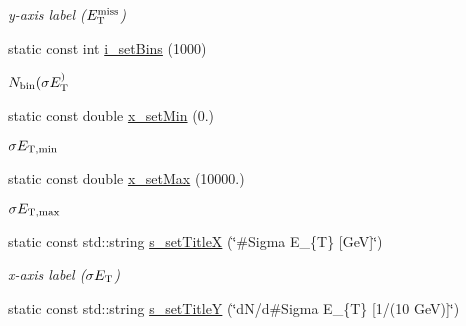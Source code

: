 \begin{CompactItemize}
\begin{CompactList}\small\item\em y-axis label ($E_{\rm T}^{\rm miss}$) \item\end{CompactList}\item 
\hypertarget{namespaceHistGroupCfg_7fcd5443b167cb799029baa462f43d1c}{
static const int \hyperlink{namespaceHistGroupCfg_7fcd5443b167cb799029baa462f43d1c}{i\_\-set\-Bins} (1000)}
\label{namespaceHistGroupCfg_7fcd5443b167cb799029baa462f43d1c}

\begin{CompactList}\small\item\em $N_{\rm bin}(\sigma E_{\rm T}^)$ \item\end{CompactList}\item 
\hypertarget{namespaceHistGroupCfg_10fc14353baebac7e3273a7c90a9befd}{
static const double \hyperlink{namespaceHistGroupCfg_10fc14353baebac7e3273a7c90a9befd}{x\_\-set\-Min} (0.)}
\label{namespaceHistGroupCfg_10fc14353baebac7e3273a7c90a9befd}

\begin{CompactList}\small\item\em $\sigma E_{\rm T,min}$ \item\end{CompactList}\item 
\hypertarget{namespaceHistGroupCfg_20c108737ca28378aa5e9b6b4afec301}{
static const double \hyperlink{namespaceHistGroupCfg_20c108737ca28378aa5e9b6b4afec301}{x\_\-set\-Max} (10000.)}
\label{namespaceHistGroupCfg_20c108737ca28378aa5e9b6b4afec301}

\begin{CompactList}\small\item\em $\sigma E_{\rm T,max}$ \item\end{CompactList}\item 
\hypertarget{namespaceHistGroupCfg_2f7f845e92099b323f0d1415a9eabfd8}{
static const std::string \hyperlink{namespaceHistGroupCfg_2f7f845e92099b323f0d1415a9eabfd8}{s\_\-set\-Title\-X} (\char`\"{}\#Sigma E\_\-\{T\} \mbox{[}Ge\-V\mbox{]}\char`\"{})}
\label{namespaceHistGroupCfg_2f7f845e92099b323f0d1415a9eabfd8}

\begin{CompactList}\small\item\em x-axis label ($\sigma E_{\rm T}$) \item\end{CompactList}\item 
\hypertarget{namespaceHistGroupCfg_cd890445a5f16977a785630b3cfadb93}{
static const std::string \hyperlink{namespaceHistGroupCfg_cd890445a5f16977a785630b3cfadb93}{s\_\-set\-Title\-Y} (\char`\"{}d\-N/d\#Sigma E\_\-\{T\} \mbox{[}1/(10 Ge\-V)\mbox{]}\char`\"{})}
\label{namespaceHistGroupCfg_cd890445a5f16977a785630b3cfadb93}


\end{CompactItemize}
